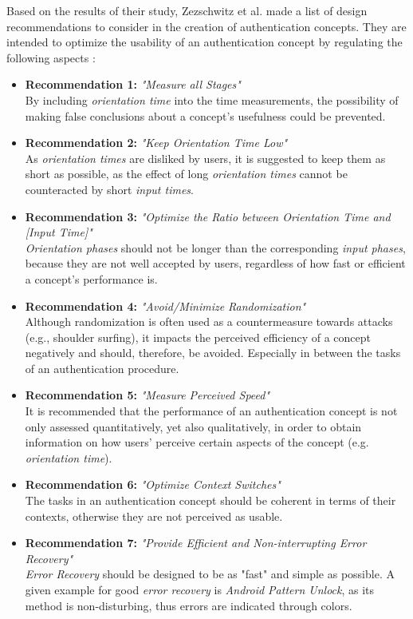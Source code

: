 Based on the results of their study, Zezschwitz et al. \cite{Zezschwitz} made a list of design recommendations to consider in the creation of authentication concepts. They are intended to optimize the usability of an authentication concept by regulating the following aspects \cite{Zezschwitz}:

\begin{itemize}
    \item \textbf{Recommendation 1:} \textit{"Measure all Stages"}\\
    By including \textit{orientation time} into the time measurements, the possibility of making false conclusions about a concept's usefulness could be prevented.
    \item \textbf{Recommendation 2:} \textit{"Keep Orientation Time Low"}\\
    As \textit{orientation times} are disliked by users, it is suggested to keep them as short as possible, as the effect of long \textit{orientation times} cannot be counteracted by short \textit{input times}.
    \item \textbf{Recommendation 3:} \textit{"Optimize the Ratio between Orientation Time and [Input Time]"} \\
    \textit{Orientation phases} should not be longer than the corresponding \textit{input phases}, because they are not well accepted by users, regardless of how fast or efficient a concept's performance is.
    \item \textbf{Recommendation 4:} \textit{"Avoid/Minimize Randomization"}\\ 
    Although randomization is often used as a countermeasure towards attacks (e.g., shoulder surfing), it impacts the perceived efficiency of a concept negatively and should, therefore, be avoided. Especially in between the tasks of an authentication procedure.
    \item \textbf{Recommendation 5:} \textit{"Measure Perceived Speed"}\\
    It is recommended that the performance of an authentication concept is not only assessed quantitatively, yet also qualitatively, in order to obtain information on how users' perceive certain aspects of the concept (e.g. \textit{orientation time}).  
    \item \textbf{Recommendation 6:} \textit{"Optimize Context Switches"}\\
    The tasks in an authentication concept should be coherent in terms of their contexts, otherwise they are not perceived as usable. 
    \item \textbf{Recommendation 7:} \textit{"Provide Efficient and Non-interrupting Error Recovery"}\\
    \textit{Error Recovery} should be designed to be as "fast" and simple as possible. A given example for good \textit{error recovery} is \textit{Android Pattern Unlock}, as its method is non-disturbing, thus errors are indicated through colors.  
\end{itemize}


